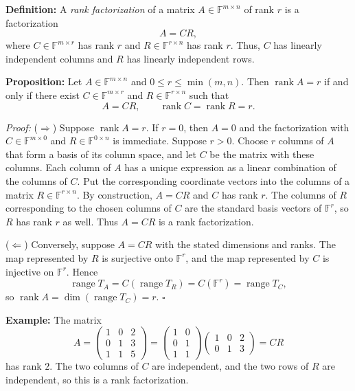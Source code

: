 \documentclass[a4paper,11pt,abstract=true]{scrartcl}
\theoremstyle{dotlessP}
\theoremstyle{dotlessS}
\theoremstyle{remark}
\theoremstyle{definition}
\begin{document}
\begin{definition_box}
\textbf{Definition:} A \emph{rank factorization} of a matrix
$A\in\mathbb{F}^{m\times n}$ of rank $r$ is a factorization
\[
A=CR,
\]
where $C\in\mathbb{F}^{m\times r}$ has rank $r$ and
$R\in\mathbb{F}^{r\times n}$ has rank $r$. Thus, $C$ has linearly
independent columns and $R$ has linearly independent rows.
\end{definition_box}

\begin{problem_box}
\textbf{Proposition:} Let $A\in\mathbb{F}^{m\times n}$ and
$0\leq r\leq\min(m,n)$. Then $\operatorname{rank}A=r$ if and only if
there exist $C\in\mathbb{F}^{m\times r}$ and
$R\in\mathbb{F}^{r\times n}$ such that
\[
A=CR,\qquad \operatorname{rank}C=\operatorname{rank}R=r.
\]
\end{problem_box}

\begin{claim_box}
\textit{Proof:} ($\Rightarrow$) Suppose $\operatorname{rank}A=r$.
If $r=0$, then $A=0$ and the factorization with
$C\in\mathbb{F}^{m\times0}$ and $R\in\mathbb{F}^{0\times n}$ is
immediate. Suppose $r>0$. Choose $r$ columns of $A$ that form a basis
of its column space, and let $C$ be the matrix with these columns.
Each column of $A$ has a unique expression as a linear combination of
the columns of $C$. Put the corresponding coordinate vectors into the
columns of a matrix $R\in\mathbb{F}^{r\times n}$. By construction,
$A=CR$ and $C$ has rank $r$. The columns of $R$ corresponding to the
chosen columns of $C$ are the standard basis vectors of $\mathbb{F}^r$,
so $R$ has rank $r$ as well. Thus $A=CR$ is a rank factorization.

($\Leftarrow$) Conversely, suppose $A=CR$ with the stated dimensions
and ranks. The map represented by $R$ is surjective onto $\mathbb{F}^r$,
and the map represented by $C$ is injective on $\mathbb{F}^r$. Hence
\[
\operatorname{range}T_A
=C(\operatorname{range}T_R)
=C(\mathbb{F}^r)
=\operatorname{range}T_C,
\]
so $\operatorname{rank}A=\dim(\operatorname{range}T_C)=r$.
\hfill$\square$
\end{claim_box}

\begin{example_box}
\textbf{Example:} The matrix
\[
A=\begin{pmatrix}1&0&2\\0&1&3\\1&1&5\end{pmatrix}
=\begin{pmatrix}1&0\\0&1\\1&1\end{pmatrix}
\begin{pmatrix}1&0&2\\0&1&3\end{pmatrix}=CR
\]
has rank $2$. The two columns of $C$ are independent, and the two rows
of $R$ are independent, so this is a rank factorization.
\end{example_box}
\end{document}
